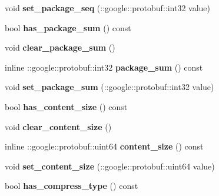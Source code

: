 \begin{DoxyCompactItemize}
void {\bfseries set\+\_\+package\+\_\+seq} (\+::google\+::protobuf\+::int32 value)
\item 
\mbox{\label{classruntime_1_1FileSendProtos_a27188fb48fb4fbc10972efd2fa2a2c87}} 
bool {\bfseries has\+\_\+package\+\_\+sum} () const
\item 
\mbox{\label{classruntime_1_1FileSendProtos_a24fd1a897af8a765f7b2435a31f79345}} 
void {\bfseries clear\+\_\+package\+\_\+sum} ()
\item 
\mbox{\label{classruntime_1_1FileSendProtos_ab3fe35a350d3bcc61a9bd716bef49f24}} 
inline \+::google\+::protobuf\+::int32 {\bfseries package\+\_\+sum} () const
\item 
\mbox{\label{classruntime_1_1FileSendProtos_a8fcdc7e7c0018931b85a1256d7c5b7ea}} 
void {\bfseries set\+\_\+package\+\_\+sum} (\+::google\+::protobuf\+::int32 value)
\item 
\mbox{\label{classruntime_1_1FileSendProtos_aae9ce0b0201e056d933a1dccd4c62d72}} 
bool {\bfseries has\+\_\+content\+\_\+size} () const
\item 
\mbox{\label{classruntime_1_1FileSendProtos_ab31e53ebe582474f2c3a1e60090341b7}} 
void {\bfseries clear\+\_\+content\+\_\+size} ()
\item 
\mbox{\label{classruntime_1_1FileSendProtos_a55aa2cc4fe04674803544b30b8dc46bc}} 
inline \+::google\+::protobuf\+::uint64 {\bfseries content\+\_\+size} () const
\item 
\mbox{\label{classruntime_1_1FileSendProtos_a4083d44ce70f2d8b3362fc30d70f2b9c}} 
void {\bfseries set\+\_\+content\+\_\+size} (\+::google\+::protobuf\+::uint64 value)
\item 
\mbox{\label{classruntime_1_1FileSendProtos_a7bf324f456dd2eb7f586202c58dcecc6}} 
bool {\bfseries has\+\_\+compress\+\_\+type} () const
\item 
\mbox{\label{classruntime_1_1FileSendProtos_a148b840333ecd4d8e2d71f57c2ddb8dc}} 

\end{DoxyCompactItemize}
